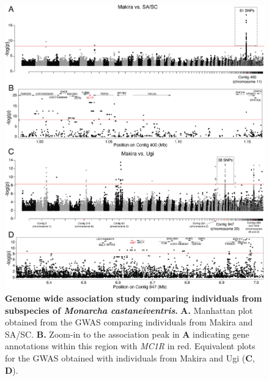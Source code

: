 \begin{figure}%
    \centering
    \includegraphics[width=\textwidth]{monarcha_figs/mon_F2.PNG}
    \caption[Genome wide association study comparing individuals from subspecies of \textit{Monarcha castaneiventris}.]{\textbf{Genome wide association study comparing individuals from subspecies of \textit{Monarcha castaneiventris}.} \textbf{A.} Manhattan plot obtained from the \acs{GWAS} comparing individuals from Makira and \ac{SA/SC}. \textbf{B.} Zoom-in to the association peak in \textbf{A} indicating gene annotations within this region with \textit{MC1R} in red. Equivalent plots for the \acs{GWAS} obtained with individuals from Makira and Ugi (\textbf{C}, \textbf{D}).}
    \label{fig:mon-F2}
\end{figure}

